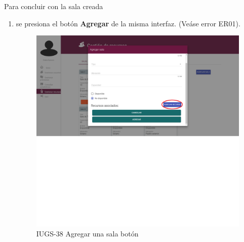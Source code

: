 	Para concluir con la sala creada 
	\begin{enumerate}
		\item se presiona el botón \textbf{Agregar}
				de la misma interfaz. (Veáse error ER01).\par		
		 	\begin{figure}[hbtp]	
				\centering
					\includegraphics[scale=0.3]{images/Interfaz/IUGS38_AgregarSalaB.png}
					\caption{IUGS-38 Agregar una sala botón}
			\end{figure}
			

\end{enumerate}
